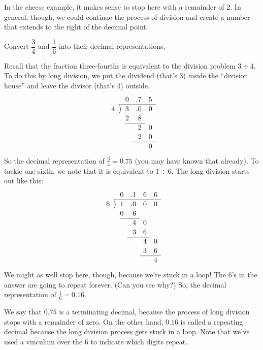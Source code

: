 In the cheese example, it makes sense to stop here with a remainder of 2. In general, though, we could continue the process of division and create a number that extends to the right of the decimal point.

\begin{boxex}
Convert $\dfrac{3}{4}$ and $\dfrac{1}{6}$ into their decimal representations.

\bigskip{} Recall that the fraction three-fourths is equivalent to the division problem $3 \div 4$. To do this by long division, we put the dividend (that's 3) inside the ``division house'' and leave the divisor (that's 4) outside.
\[
\renewcommand\arraystretch{1.1}
\begin{array}{*1r @{\hskip\arraycolsep}c@{\hskip\arraycolsep} *3r}
	&&			0& .7	& 5 \\
\cline{2-5}
4	&\big)&	3	& .0	& 0 \\
	&&		2	&8		\\
\cline{3-4}
	&&			&2 & 0 \\
	&&			&2 & 0 \\
\cline{4-5}
	&&			&& 0 \\
\end{array}
\]
So the decimal representation of $\frac{3}{4} = 0.75$ (you may have known that already). To tackle one-sixth, we note that it is equivalent to $1 \div 6$. The long division starts out like this:
\[
\renewcommand\arraystretch{1.1}
\begin{array}{*1r @{\hskip\arraycolsep}c@{\hskip\arraycolsep} *4r}
	&&			0& .1	& 6	& 6 \\
\cline{2-6}
6	&\big)&	1	& .0	& 0	& 0 \\
	&&		0	&6		\\
\cline{3-4}
	&&			&4	& 0 \\
	&&			&3	& 6 \\
\cline{4-5}
	&&			&	& 4	& 0 \\
	&&			&	& 3	& 6 \\
\cline{5-6}
	&&			&	&	& 4
\end{array}
\]
We might as well stop here, though, because we're stuck in a loop! The 6's in the answer are going to repeat forever. (Can you see why?) So, the decimal representation of $\frac{1}{6} = 0.1\overline{6}$.
\end{boxex}

We say that $0.75$ is a terminating decimal, because the process of long division stops with a remainder of zero. On the other hand, $0.1\overline{6}$ is called a repeating decimal because the long division process gets stuck in a loop. Note that we've used a vinculum over the 6 to indicate which digits repeat.

